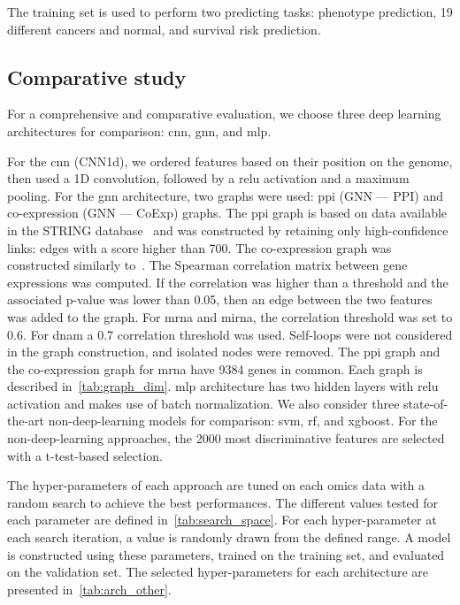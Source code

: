 \documentclass[../main.tex]{subfiles}
\begin{document}
	    The training set is used to perform two predicting tasks: phenotype prediction, 19 different cancers and normal, and survival risk prediction.

	\subsection{Comparative study}
	    For a comprehensive and comparative evaluation, we choose three deep learning architectures for comparison: \gls{cnn}, \gls{gnn}, and \gls{mlp}.

	    For the \gls{cnn} (CNN1d), we ordered features based on their position on the genome, then used a 1D convolution, followed by a \gls{relu} activation and a maximum pooling.
	    For the \gls{gnn} architecture, two graphs were used: \gls{ppi} (GNN --- PPI) and co-expression (GNN --- CoExp) graphs.
	    The \gls{ppi} graph is based on data available in the STRING database~\cite{Szklarczyk2020} and was constructed by retaining only high-confidence links: edges with a score higher than 700.
	    The co-expression graph was constructed similarly to~\cite{ramirezClassificationCancerTypes2020}.
	    The Spearman correlation matrix between gene expressions was computed.
	    If the correlation was higher than a threshold and the associated p-value was lower than 0.05, then an edge between the two features was added to the graph.
	    For \gls{mrna} and \gls{mirna}, the correlation threshold was set to 0.6.
	    For \gls{dnam} a 0.7 correlation threshold was used.
	    Self-loops were not considered in the graph construction, and isolated nodes were removed.
	    The \gls{ppi} graph and the co-expression graph for \gls{mrna} have 9384 genes in common.
	    Each graph is described in~\cref{tab:graph_dim}.
	    \Gls{mlp} architecture has two hidden layers with \gls{relu} activation and makes use of batch normalization.
	    We also consider three state-of-the-art non-deep-learning models for comparison: \gls{svm}, \gls{rf}, and \gls{xgboost}.
	    For the non-deep-learning approaches, the 2000 most discriminative features are selected with a t-test-based selection.

	    The hyper-parameters of each approach are tuned on each omics data with a random search to achieve the best performances.
	    The different values tested for each parameter are defined in~\cref{tab:search_space}.
	    For each hyper-parameter at each search iteration, a value is randomly drawn from the defined range.
	    A model is constructed using these parameters, trained on the training set, and evaluated on the validation set.
	    The selected hyper-parameters for each architecture are presented in~\cref{tab:arch_other}.
\end{document}
